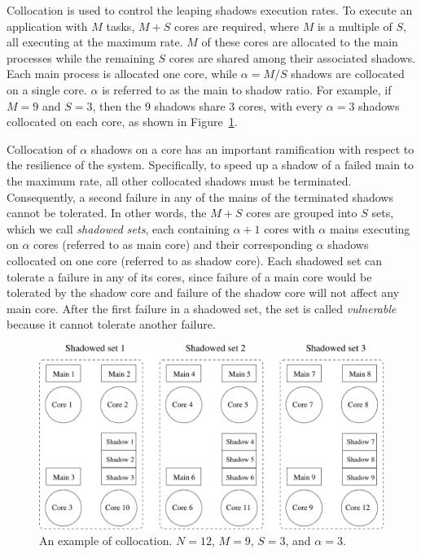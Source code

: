 Collocation is used to control the leaping shadows execution rates. To execute an application with $M$ tasks, $M+S$ cores are required, where $M$ is a multiple of $S$, all executing at the maximum rate. $M$ of these cores are allocated to the main processes while the remaining $S$ cores are shared among their associated shadows. Each main process is allocated one core, while $\alpha=M/S$ shadows are collocated on a single core. $\alpha$ is referred to as the main to shadow ratio. For example, if $M=9$ and $S=3$, then the 9 shadows share 3 cores, with every $\alpha=3$ shadows collocated on each core, as shown in Figure~\ref{fig:sc_mapping}.
  
Collocation of $\alpha$ shadows on a core has an important ramification with respect to the resilience of the system. Specifically, to speed up a shadow 
of a failed main to the maximum rate, all other collocated shadows must be terminated. Consequently, a second failure in any of the mains of the terminated shadows cannot be tolerated. In other words, the $M+S$ cores are grouped into $S$ sets, which we call \emph{shadowed sets}, each containing $\alpha+1$ cores with $\alpha$ mains executing on $\alpha$ cores (referred to as main core) and their corresponding $\alpha$ shadows collocated on one core (referred to as shadow core). Each shadowed set can tolerate a failure in any of its cores, since failure of a main core would be tolerated by the shadow core and failure of the shadow core will not affect any main core. After the first failure in a shadowed set, the set is called \emph{vulnerable} because it cannot tolerate another failure. %

\begin{figure}[!t]
  \begin{center}
    \includegraphics[width=0.7\columnwidth]{Figures/sc_mapping.pdf}
  \end{center}
  \caption{An example of collocation. $N=12$, $M=9$, $S=3$, and $\alpha=3$.}
  \label{fig:sc_mapping}
\end{figure}





